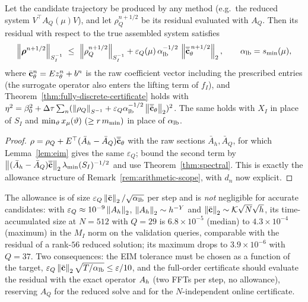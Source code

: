 \begin{theorem}\label{thm:eim-cert}
Let the candidate trajectory be produced by any method (e.g.\ the reduced
system $V^\top A_Q(\mu)V$), and let $\rho_Q^{n+1/2}$ be its residual
evaluated with $A_Q$.  Then its residual with respect to the true assembled
system satisfies
\[
 \norm{\rr^{n+1/2}}_{S_I^{-1}}\ \le\ \norm{\rho_Q^{n+1/2}}_{S_I^{-1}}
 +\varepsilon_Q(\mu)\,\alpha_{\rm lb}^{-1/2}\,\norm{\overline{\bar\cc}_\theta^{\,n+1/2}}_2,
 \qquad \alpha_{\rm lb}=\smin(\mu),
\]
where $\bar{\mathbf c}_\theta^n=Ez_\theta^n+b^n$ is the raw coefficient vector including the prescribed
entries (the surrogate operator also enters the lifting term of $f_I$), and
Theorem~\ref{thm:fully-discrete-certificate} holds with
$\eta^2=\beta_0^2+\Delta\tau\sum_n(\left\lVert \rho_Q\right\rVert_{S^{-1}}+\varepsilon_Q\alpha_{\rm lb}^{-1/2}\left\lVert \overline{\bar{\mathbf c}}_\theta\right\rVert_2)^2$.
The same holds with $X_I$ in place of $S_I$ and $\min_\vartheta \sym{x}_\mu(\vartheta)\ (\ge \rf\,m_{\min})$ in place of $\alpha_{\rm lb}$.
\end{theorem}
\begin{proof}
$\rho=\rho_Q+E^\top(\bar A_h-\bar A_Q)\overline{\bar{\mathbf c}}_\theta$ with the raw sections $\bar A_h,\bar A_Q$,
for which Lemma~\ref{lem:eim} gives the same $\varepsilon_Q$; bound the second term by
$\left\lVert (\bar A_h-\bar A_Q)\overline{\bar{\mathbf c}}\right\rVert_2\lambda_{\min}(S_I)^{-1/2}$ and use
Theorem~\ref{thm:spectral}.  This is exactly the allowance structure of
Remark~\ref{rem:arithmetic-scope}, with $d_n$ now explicit.
\end{proof}
The allowance is of size $\varepsilon_Q\left\lVert \bar{\mathbf c}\right\rVert_2/\sqrt{\alpha_{\rm lb}}$ per step and is
\emph{not} negligible for accurate candidates: with $\varepsilon_Q\approx10^{-9}\left\lVert A_h\right\rVert_2$,
$\left\lVert A_h\right\rVert_2\sim h^{-Y}$ and $\left\lVert \bar{\mathbf c}\right\rVert_2\sim \mathcal K\sqrt{N}\sqrt h$, its time-accumulated size at
$N=512$ with $Q=29$ is $6.8\times10^{-5}$ (median) to $4.3\times10^{-4}$ (maximum) in the $M_I$ norm on the
validation queries, comparable with the residual of a rank-$56$ reduced solution; its maximum drops to
$3.9\times10^{-6}$ with $Q=37$.  Two
consequences: the EIM tolerance must be chosen as a function of the target,
$\varepsilon_Q\left\lVert \bar{\mathbf c}\right\rVert_2\sqrt{T/\alpha_{\rm lb}}\le\varepsilon/10$, and the full-order
certificate should evaluate the residual with the exact operator $A_h$ (two FFTs per step, no
allowance), reserving $A_Q$ for the reduced solve and for the $N$-independent online certificate.
